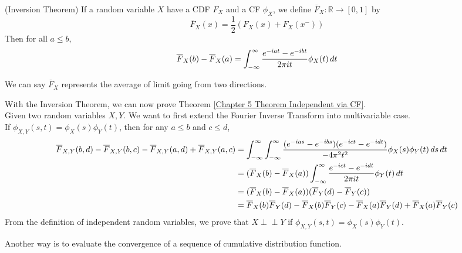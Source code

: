 \documentclass{huhtakm-template-book}
\newcommand{\independent}{\perp\!\!\!\perp}
\begin{document}
    \begin{thm}(Inversion Theorem)
        If a random variable $X$ have a CDF $F_{X}$ and a CF $\phi_{X}$, we define $\overline{F}_{X}:\mathbb{R}\to[0,1]$ by
        \begin{equation*}
            \overline{F}_{X}(x)=\frac{1}{2}\left(F_{X}(x)+F_{X}(x^{-})\right)
        \end{equation*}
        Then for all $a\leq b$,
        \begin{equation*}
            \overline{F}_{X}(b)-\overline{F}_{X}(a)=\int_{-\infty}^{\infty}\frac{e^{-iat}-e^{-ibt}}{2\pi it}\phi_{X}(t)\,dt
        \end{equation*}
    \end{thm}
    \begin{rem}
        We can say $\overline{F}_{X}$ represents the average of limit going from two directions.
    \end{rem}
    \begin{eg}
        \label{Chapter 5 Example Proof of Theorem 5.27}
        With the Inversion Theorem, we can now prove Theorem \ref{Chapter 5 Theorem Independent via CF}.\\
        Given two random variables $X,Y$. We want to first extend the Fourier Inverse Transform into multivariable case.\\
        If $\phi_{X,Y}(s,t)=\phi_{X}(s)\phi_{Y}(t)$, then for any $a\leq b$ and $c\leq d$,
        \begin{align*}
            \overline{F}_{X,Y}(b,d)-\overline{F}_{X,Y}(b,c)-\overline{F}_{X,Y}(a,d)+\overline{F}_{X,Y}(a,c)&=\int_{-\infty}^{\infty}\int_{-\infty}^{\infty}\frac{(e^{-ias}-e^{-ibs})(e^{-ict}-e^{-idt})}{-4\pi^{2}t^{2}}\phi_{X}(s)\phi_{Y}(t)\,ds\,dt\\
            &=(\overline{F}_{X}(b)-\overline{F}_{X}(a))\int_{-\infty}^{\infty}\frac{e^{-ict}-e^{-idt}}{2\pi it}\phi_{Y}(t)\,dt\\
            &=(\overline{F}_{X}(b)-\overline{F}_{X}(a))(\overline{F}_{Y}(d)-\overline{F}_{Y}(c))\\
            &=\overline{F}_{X}(b)\overline{F}_{Y}(d)-\overline{F}_{X}(b)\overline{F}_{Y}(c)-\overline{F}_{X}(a)\overline{F}_{Y}(d)+\overline{F}_{X}(a)\overline{F}_{Y}(c)
        \end{align*}
        From the definition of independent random variables, we prove that $X\independent Y$ if $\phi_{X,Y}(s,t)=\phi_{X}(s)\phi_{Y}(t)$.
    \end{eg}
    \newpage
    Another way is to evaluate the convergence of a sequence of cumulative distribution function.
\end{document}

